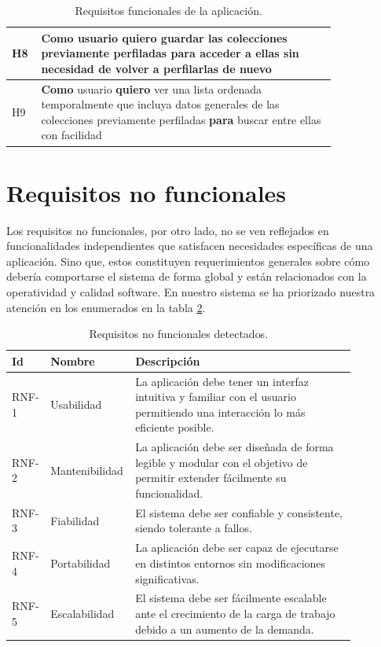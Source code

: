 \begin{table}[H]
{\begin{tabular}{|p{0.04\linewidth} | p{0.78\linewidth}|}
    H8 & \textbf{Como} usuario \textbf{quiero} guardar las colecciones previamente perfiladas \textbf{para} acceder a ellas sin necesidad de volver a perfilarlas de nuevo \\ \hline
    H9 & \textbf{Como} usuario \textbf{quiero} ver una lista ordenada temporalmente que incluya datos generales de las colecciones previamente perfiladas \textbf{para} buscar entre ellas con facilidad \\ \hline
    \end{tabular}%
}
    \caption{Requisitos funcionales de la aplicación.}
\label{tab:user-stories}
\end{table}

\section{Requisitos no funcionales}
Los requisitos no funcionales, por otro lado, no se ven reflejados en funcionalidades independientes que satisfacen necesidades específicas de una aplicación. Sino que, estos constituyen requerimientos generales sobre cómo debería comportarse el sistema de forma global y están relacionados con la operatividad y calidad software. En nuestro sistema se ha priorizado nuestra atención en los enumerados en la tabla \ref{tab:rnf}.

\begin{table}[H]
{
    \setlength{\tabcolsep}{0.4\tabcolsep}
    
    \begin{tabular}{|p{0.07\linewidth} | p{0.17\linewidth}| p{0.63\linewidth}|}
    \hline
    Id & Nombre & Descripción\\ \hline
    RNF-1 & Usabilidad & La aplicación debe tener un interfaz intuitiva y familiar con el usuario permitiendo una interacción lo más eficiente posible.\\ \hline
    RNF-2 & Mantenibilidad & La aplicación debe ser diseñada de forma legible y modular con el objetivo de permitir extender fácilmente su funcionalidad.\\ \hline
    RNF-3 & Fiabilidad & El sistema debe ser confiable y consistente, siendo tolerante a fallos. \\ \hline
    RNF-4 & Portabilidad & La aplicación debe ser capaz de ejecutarse en distintos entornos sin modificaciones significativas.\\ \hline
    RNF-5 & Escalabilidad & El sistema debe ser fácilmente escalable ante el crecimiento de la carga de trabajo debido a un aumento de la demanda.\\ \hline
    \end{tabular}%
}
    \caption{Requisitos no funcionales detectados.}
\label{tab:rnf}
\end{table}

